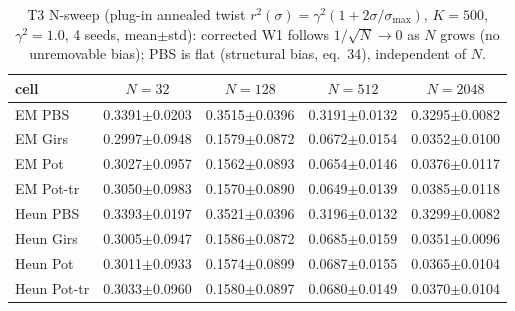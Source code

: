\begin{table}[ht]
\centering
\caption{T3 N-sweep (plug-in annealed twist $r^2(\sigma)=\gamma^2(1+2\sigma/\sigma_{\max})$, $K=500$, $\gamma^2=1.0$, 4 seeds, mean$\pm$std): corrected W1 follows $1/\sqrt{N}\to 0$ as $N$ grows (no unremovable bias); PBS is flat (structural bias, eq.~34), independent of $N$.}
\label{tab:toy_t3_n}
\begin{tabular}{lcccc}
\toprule
cell & $N=32$ & $N=128$ & $N=512$ & $N=2048$ \\
\midrule
EM PBS & 0.3391$\pm$0.0203 & 0.3515$\pm$0.0396 & 0.3191$\pm$0.0132 & 0.3295$\pm$0.0082 \\
EM Girs & 0.2997$\pm$0.0948 & 0.1579$\pm$0.0872 & 0.0672$\pm$0.0154 & 0.0352$\pm$0.0100 \\
EM Pot & 0.3027$\pm$0.0957 & 0.1562$\pm$0.0893 & 0.0654$\pm$0.0146 & 0.0376$\pm$0.0117 \\
EM Pot-tr & 0.3050$\pm$0.0983 & 0.1570$\pm$0.0890 & 0.0649$\pm$0.0139 & 0.0385$\pm$0.0118 \\
Heun PBS & 0.3393$\pm$0.0197 & 0.3521$\pm$0.0396 & 0.3196$\pm$0.0132 & 0.3299$\pm$0.0082 \\
Heun Girs & 0.3005$\pm$0.0947 & 0.1586$\pm$0.0872 & 0.0685$\pm$0.0159 & 0.0351$\pm$0.0096 \\
Heun Pot & 0.3011$\pm$0.0933 & 0.1574$\pm$0.0899 & 0.0687$\pm$0.0155 & 0.0365$\pm$0.0104 \\
Heun Pot-tr & 0.3033$\pm$0.0960 & 0.1580$\pm$0.0897 & 0.0680$\pm$0.0149 & 0.0370$\pm$0.0104 \\
\bottomrule
\end{tabular}
\end{table}
